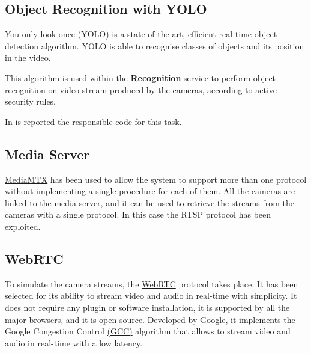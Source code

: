 \documentclass{scrartcl}
\begin{document}
    

    \subsection{Object Recognition with YOLO}
    You only look once (\href{https://pjreddie.com/darknet/yolo}{YOLO}) is a state-of-the-art, efficient real-time object detection algorithm.
    YOLO is able to recognise classes of objects and its position in the video.

    This algorithm is used within the \textbf{Recognition} service to perform object recognition on video stream produced by the cameras, according to active security rules.

    In  is reported the responsible code for this task.
    


    \subsection{Media Server}
    \href{https://github.com/bluenviron/mediamtx}{MediaMTX} has been used to allow the system to support more than one protocol without implementing a single procedure for each of them.
    All the cameras are linked to the media server, and it can be used to retrieve the streams from the cameras with a single protocol.
    In this case the RTSP protocol has been exploited.

    \subsection{WebRTC}
    To simulate the camera streams, the \href{https://webrtc.org/}{WebRTC} protocol takes place.
    It has been selected for its ability to stream video and audio in real-time with simplicity.
    It does not require any plugin or software installation, it is supported by all the major browsers, and it is open-source.
    Developed by Google, it implements the Google Congestion Control \href{https://www.researchgate.net/publication/316684665_Congestion_Control_for_Real-Time_Communication}{(GCC)} algorithm that allows to stream video and audio in real-time with a low latency.
\end{document}
